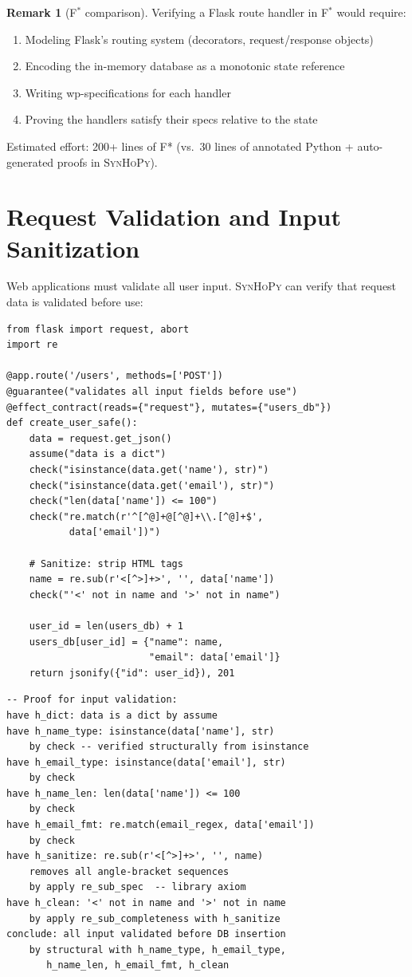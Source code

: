 \documentclass[11pt,a4paper]{report}
\theoremstyle{definition}
\newtheorem{remark}[definition]{Remark}
\theoremstyle{plain}
\newcommand{\fstar}{F$^{*}$}
\newcommand{\synhopy}{\textsc{SynHoPy}}
\begin{document}
\begin{remark}[\fstar{} comparison]
Verifying a Flask route handler in \fstar{} would require:
\begin{enumerate}
  \item Modeling Flask's routing system (decorators, request/response objects)
  \item Encoding the in-memory database as a monotonic state reference
  \item Writing wp-specifications for each handler
  \item Proving the handlers satisfy their specs relative to the state
\end{enumerate}
Estimated effort: 200+ lines of F* (vs.\ 30 lines of annotated Python + auto-generated proofs in \synhopy{}).
\end{remark}

\section{Request Validation and Input Sanitization}

Web applications must validate all user input.  \synhopy{} can verify that
request data is validated before use:

\begin{lstlisting}[style=synhopy]
from flask import request, abort
import re

@app.route('/users', methods=['POST'])
@guarantee("validates all input fields before use")
@effect_contract(reads={"request"}, mutates={"users_db"})
def create_user_safe():
    data = request.get_json()
    assume("data is a dict")
    check("isinstance(data.get('name'), str)")
    check("isinstance(data.get('email'), str)")
    check("len(data['name']) <= 100")
    check("re.match(r'^[^@]+@[^@]+\\.[^@]+$',
           data['email'])")

    # Sanitize: strip HTML tags
    name = re.sub(r'<[^>]+>', '', data['name'])
    check("'<' not in name and '>' not in name")

    user_id = len(users_db) + 1
    users_db[user_id] = {"name": name,
                         "email": data['email']}
    return jsonify({"id": user_id}), 201
\end{lstlisting}

\begin{lstlisting}[style=proof]
-- Proof for input validation:
have h_dict: data is a dict by assume
have h_name_type: isinstance(data['name'], str)
    by check -- verified structurally from isinstance
have h_email_type: isinstance(data['email'], str)
    by check
have h_name_len: len(data['name']) <= 100
    by check
have h_email_fmt: re.match(email_regex, data['email'])
    by check
have h_sanitize: re.sub(r'<[^>]+>', '', name)
    removes all angle-bracket sequences
    by apply re_sub_spec  -- library axiom
have h_clean: '<' not in name and '>' not in name
    by apply re_sub_completeness with h_sanitize
conclude: all input validated before DB insertion
    by structural with h_name_type, h_email_type,
       h_name_len, h_email_fmt, h_clean
\end{lstlisting}
\end{document}
